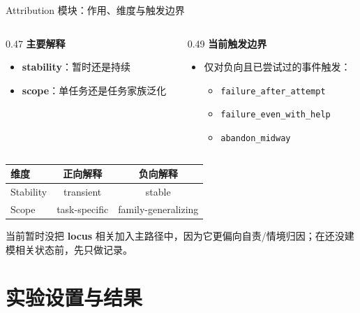 \documentclass[aspectratio=169]{beamer}
\begin{document}
\begin{frame}{Attribution 模块：作用、维度与触发边界}
\begin{columns}[T]
\begin{column}{0.47\textwidth}
\textbf{主要解释}
\begin{itemize}
    \item \textbf{stability}：暂时还是持续
    \item \textbf{scope}：单任务还是任务家族泛化
\end{itemize}
\end{column}

\begin{column}{0.49\textwidth}
\textbf{当前触发边界}
\begin{itemize}
    \item 仅对负向且已尝试过的事件触发：
    \begin{itemize}
        \item \texttt{failure\_after\_attempt}
        \item \texttt{failure\_even\_with\_help}
        \item \texttt{abandon\_midway}
    \end{itemize}
\end{itemize}
\end{column}
\end{columns}

\vspace{0.25cm}
\centering
\scriptsize
\begin{tabular}{lcc}
\toprule
\textbf{维度} & \textbf{正向解释} & \textbf{负向解释} \\
\midrule
Stability & transient & stable \\
Scope & task-specific & family-generalizing \\
\bottomrule
\end{tabular}

\vspace{0.18cm}

{\tiny 当前暂时没把 \textbf{locus} 相关加入主路径中，因为它更偏向自责/情境归因；在还没建模相关状态前，先只做记录。}

\end{frame}

\section{实验设置与结果}
\end{document}
